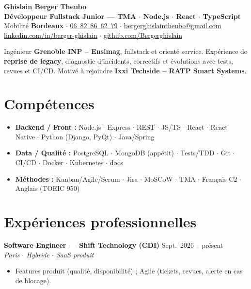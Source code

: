 \documentclass[10pt,a4paper]{article}
\begin{document}
\begin{center}
  {\LARGE\bfseries\color{ratp} Ghislain Berger Theubo}\\[2pt]
  {\large\bfseries Développeur Fullstack Junior --- TMA $\cdot$ Node.js $\cdot$ React $\cdot$ TypeScript}\\[3pt]
  Mobilité \textbf{Bordeaux} $\cdot$ \href{tel:+33682866279}{06~82~86~62~79} $\cdot$
  \href{mailto:bergerghislaintheubo@gmail.com}{bergerghislaintheubo@gmail.com}\\
  \href{https://linkedin.com/in/berger-ghislain}{linkedin.com/in/berger-ghislain} $\cdot$
  \href{https://github.com/Bergerghislain}{github.com/Bergerghislain}
\end{center}
\vspace{3pt}
Ingénieur \textbf{Grenoble INP -- Ensimag}, fullstack et orienté service.
Expérience de \textbf{reprise de legacy}, diagnostic d'incidents, correctifs et évolutions avec tests, revues et CI/CD.
Motivé à rejoindre \textbf{Ixxi Techside -- RATP Smart Systems}.

\section*{Compétences}
\begin{itemize}
  \item \textbf{Backend / Front :} Node.js $\cdot$ Express $\cdot$ REST $\cdot$ JS/TS $\cdot$ React $\cdot$ React Native $\cdot$ Python (Django, PyQt) $\cdot$ Java/Spring
  \item \textbf{Data / Qualité :} PostgreSQL $\cdot$ MongoDB (appétit) $\cdot$ Tests/TDD $\cdot$ Git $\cdot$ CI/CD $\cdot$ Docker $\cdot$ Kubernetes $\cdot$ docs
  \item \textbf{Méthodes :} Kanban/Agile/Scrum $\cdot$ Jira $\cdot$ MoSCoW $\cdot$ TMA $\cdot$ Français C2 $\cdot$ Anglais (TOEIC 950)
\end{itemize}

\section*{Expériences professionnelles}

\textbf{Software Engineer --- Shift Technology (CDI)} \hfill Sept.\ 2026 -- présent\\
{\small\textit{Paris $\cdot$ Hybride $\cdot$ SaaS produit}}
\begin{itemize}
  \item Features produit (qualité, disponibilité) ; Agile (tickets, revues, alerte en cas de blocage).
\end{itemize}
\end{document}
